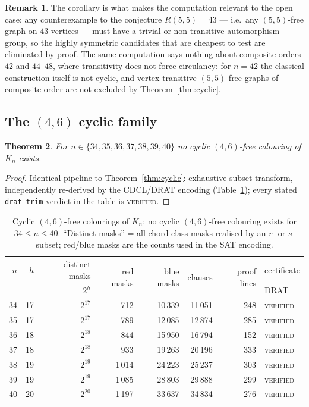 \documentclass[11pt]{article}
\newtheorem{theorem}{Theorem}
\theoremstyle{definition}
\newtheorem{remark}[theorem]{Remark}
\theoremstyle{plain}
\newcommand{\K}{\ensuremath{K}}
\newcommand{\R}[2]{\ensuremath{R(#1,#2)}}
\begin{document}
\begin{remark}
The corollary is what makes the computation relevant to the open case: any
counterexample to the conjecture $\R{5}{5} = 43$ --- i.e.\ any $(5,5)$-free
graph on $43$ vertices --- must have a trivial or non-transitive automorphism
group, so the highly symmetric candidates that are cheapest to test are
eliminated by proof. The same computation says nothing about composite orders
$42$ and $44$--$48$, where transitivity does not force circulancy: for $n = 42$
the classical construction itself is not cyclic, and vertex-transitive
$(5,5)$-free graphs of composite order are not excluded by
Theorem~\ref{thm:cyclic}.
\end{remark}

\subsection{The $(4,6)$ cyclic family}\label{sec:res46}

\begin{theorem}\label{thm:cyclic46}
For $n \in \{34,35,36,37,38,39,40\}$ no cyclic $(4,6)$-free colouring of
$\K_n$ exists.
\end{theorem}

\begin{proof}
Identical pipeline to Theorem~\ref{thm:cyclic}: exhaustive subset transform,
independently re-derived by the CDCL/DRAT encoding
(Table~\ref{tab:cyclic46}); every stated \texttt{drat-trim} verdict in the
table is \textsc{verified}.
\end{proof}

\begin{table}[ht]\centering\small
\begin{tabular}{rrrrrrrl}
\toprule
$n$ & $h$ & distinct masks & \multirow{2}{*}{red masks} & \multirow{2}{*}{blue masks} &
\multirow{2}{*}{clauses} & \multirow{2}{*}{proof lines} & certificate\\
 & & $2^h$ & & & & & DRAT \\
\midrule
34 & 17 & $2^{17}$ & 712 & 10\,339 & 11\,051 & 248 & \textsc{verified} \\
35 & 17 & $2^{17}$ & 789 & 12\,085 & 12\,874 & 285 & \textsc{verified} \\
36 & 18 & $2^{18}$ & 844 & 15\,950 & 16\,794 & 152 & \textsc{verified} \\
37 & 18 & $2^{18}$ & 933 & 19\,263 & 20\,196 & 333 & \textsc{verified} \\
38 & 19 & $2^{19}$ & 1\,014 & 24\,223 & 25\,237 & 303 & \textsc{verified} \\
39 & 19 & $2^{19}$ & 1\,085 & 28\,803 & 29\,888 & 299 & \textsc{verified} \\
40 & 20 & $2^{20}$ & 1\,197 & 33\,637 & 34\,834 & 276 & \textsc{verified} \\
\bottomrule
\end{tabular}
\caption{Cyclic $(4,6)$-free colourings of $\K_n$: no cyclic $(4,6)$-free
colouring exists for $34 \le n \le 40$. ``Distinct masks'' = all chord-class
masks realised by an $r$- or $s$-subset; red/blue masks are the counts used in
the SAT encoding.}
\label{tab:cyclic46}
\end{table}
\end{document}

